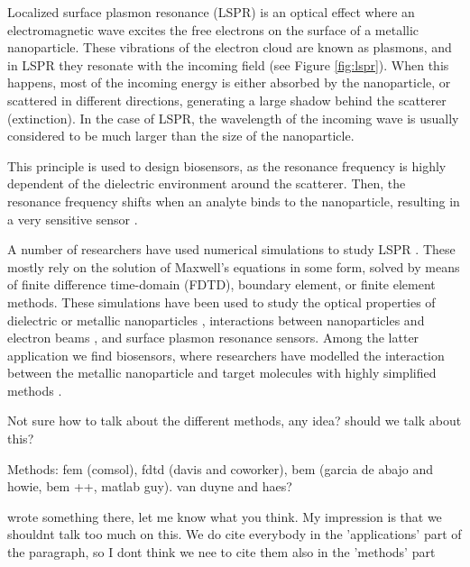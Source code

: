 Localized surface plasmon resonance (LSPR) is an optical effect where an 
electromagnetic wave excites the free electrons on the surface of a metallic nanoparticle.
These vibrations of the electron cloud are known as plasmons, and in LSPR they resonate with the incoming
field (see Figure \ref{fig:lspr}). When this happens, most of the incoming energy
is either absorbed by the nanoparticle, or scattered in different directions,
generating a large shadow behind the scatterer (extinction). In the case of LSPR,
the wavelength of the incoming wave is usually considered to be much larger than 
the size of the nanoparticle.

This principle is used to design 
biosensors, as the resonance frequency is highly dependent of the dielectric environment 
around the scatterer. 
Then, the resonance frequency shifts when an analyte binds to the nanoparticle, 
resulting in a very sensitive sensor \cite{HaesETal2004, HaesVanduyne2002}.

A number of researchers have used numerical simulations to study LSPR \cite{SolisTaboadaObelleiroLiz-MaarzanGarciadeabajo2014}. These mostly rely on the 
solution of Maxwell's equations in some form, solved by means of finite difference time-domain (FDTD),
boundary element, or finite element methods. 
These simulations have been used to study the 
optical properties of dielectric or metallic nanoparticles \cite{Hohenester2018,HohenesterTrugler2012,
JungPedersenSondergaardPedersenLarsenNielsen2010, VideenSun2003,
MayergoyzFredkinZhang2005, MayergoyzZhang2007}, interactions between nanoparticles
and electron beams \cite{GarciadeabajoAizpurua1997, GarciadeabajoHowie2002},
and surface plasmon resonance sensors.
Among the latter application we find biosensors, where researchers have modelled the 
interaction between the metallic nanoparticle and target molecules with highly 
simplified methods \cite{JungCampbellChinowskyMarYee1998,HaesVanduyne2002,DavisGomezVernon2010,AntosiewiczApellClaudioKall2011}.


{\color{red} Not sure how to talk about the different methods, any idea? should
we talk about this? 

Methods: fem (comsol), fdtd (davis and coworker), bem (garcia de abajo and 
howie, bem ++, matlab guy). van duyne and haes? }
{\color{blue} wrote something there, let me know what you think. My impression is that
we shouldnt talk too much on this. We do cite everybody in the 'applications' part of the paragraph, so I dont think we nee to cite them also in the 'methods' part}

